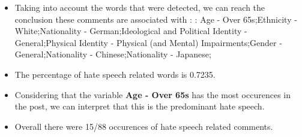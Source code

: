 \documentclass[11pt]{article}
\begin{document}
\begin{itemize}\item Taking into account the words that were detected, we can reach the conclusion these comments are associated with : : Age - Over 65s;Ethnicity - White;Nationality - German;Ideological and Political Identity - General;Physical Identity - Physical (and Mental) Impairments;Gender - General;Nationality - Chinese;Nationality - Japanese;%

\item The percentage of hate speech related words is 0.7235.

\item Considering that the variable \textbf{Age - Over 65s} has the most occurences in the post, we can interpret that this is the predominant hate speech.

\item Overall there were 15/88 occurences of hate speech related comments.\end{itemize}
\end{document}
